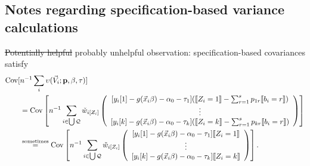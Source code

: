 \documentclass{article}
\DeclarePairedDelimiter{\indicator}{\llbracket}{\rrbracket}
\newcommand{\owt}[1][{[z_{i}]}]{\ensuremath{\check{w}_{i#1}}}
\begin{document}
\subsection{Notes regarding specification-based variance calculations}

\st{Potentially helpful} probably unhelpful observation:
specification-based covariances satisfy
\begin{align*}
  \operatorname{Cov}[&n^{-1}\sum_{i}\upsilon(\vec{V}_{i};
  \mathbf{p}, \beta, \tau)] \\
                     &=   \operatorname{Cov}\left[n^{-1}\sum_{i \in \bigcup \mathcal{Q}}
                       \owt[{[Z_{i}]}]
\left(
                                             \begin{array}{c}
           {}[y_{i}[1]
                                               -
                                               g(\vec{x}_{i}\beta)-\alpha_{0}-\tau_{1}](
                                               \indicator{Z_{i}=1} - \sum_{r=1}^{s}p_{1r}\indicator{b_{i}=r})\\
                  \vdots \\
{}           [y_{i}[k]
                                               - g(\vec{x}_{i}\beta) - \alpha_{0} -
                                               \tau_{k}](\indicator{Z_{i}=k}
                                               - \sum_{r=1}^{s}p_{kr}\indicator{b_{i}=r})\\                                             \end{array}
\right) \right]\\
                     &\stackrel{\text{sometimes}}{=}  \operatorname{Cov}\left[n^{-1}\sum_{i \in \bigcup \mathcal{Q}}
\owt[{[Z_{i}]}]
\left(
                                             \begin{array}{c}
           {}[y_{i}[1]
                                               -
                                               g(\vec{x}_{i}\beta)-\alpha_{0} -\tau_{1}]
                                               \indicator{Z_{i}=1}\\
                  \vdots \\
{}           [y_{i}[k]
                                               - g(\vec{x}_{i}\beta) - \alpha_{0}-
                                               \tau_{k}]\indicator{Z_{i}=k}\\                                             \end{array}
\right)
\right].
\end{align*}
\end{document}
